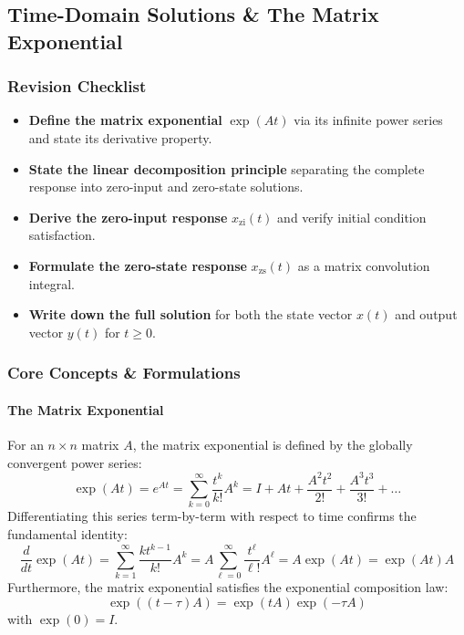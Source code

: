 \documentclass[12pt,onecolumn,twoside ]{article}
\begin{document}
	\subsection{Time-Domain Solutions \& The Matrix Exponential}
	\subsubsection{Revision Checklist}
	\begin{itemize}
		\item[$\square$]
		\textbf{Define the matrix exponential} $\exp(At)$ via its infinite power series and state its derivative property.
		\item[$\square$]
		\textbf{State the linear decomposition principle} separating the complete response into zero-input and zero-state solutions.
		\item[$\square$]
		\textbf{Derive the zero-input response} $x_{\text{zi}}(t)$ and verify initial condition satisfaction.
		\item[$\square$]
		\textbf{Formulate the zero-state response} $x_{\text{zs}}(t)$ as a matrix convolution integral.
		\item[$\square$]
		\textbf{Write down the full solution} for both the state vector $x(t)$ and output vector $y(t)$ for $t \ge 0$.
	\end{itemize}
	
	\subsubsection{Core Concepts \& Formulations}
	\paragraph{The Matrix Exponential}
	For an $n \times n$ matrix $A$, the matrix exponential is defined by the globally convergent power series: \[
	\exp(At) = e^{At} = \sum_{k=0}^{\infty} \frac{t^k}{k!} A^k = I + At + \frac{A^2 t^2}{2!} + \frac{A^3 t^3}{3!} + \dots
	\]
	Differentiating this series term-by-term with respect to time confirms the fundamental identity: \[
	\frac{d}{dt}\exp(At) = \sum_{k=1}^{\infty} \frac{k t^{k-1}}{k!} A^k = A \sum_{\ell=0}^{\infty} \frac{t^\ell}{\ell!} A^\ell = A \exp(At) = \exp(At)A
	\]
	Furthermore, the matrix exponential satisfies the exponential composition law: \[
	\exp((t - \tau)A) = \exp(tA)\exp(-\tau A)
	\] with $\exp(0) = I$.
\end{document}
